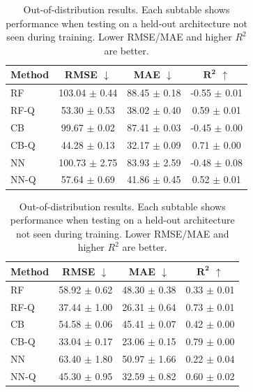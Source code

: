 \begin{table}[t]
    \centering
    \caption{Out-of-distribution results. Each subtable shows performance when testing on a held-out architecture not seen during training. Lower RMSE/MAE and higher $R^2$ are better.}
    \label{tab:ood-results}
    \vspace{0.5em}
    \begin{minipage}{0.48\textwidth}
        \centering
        \label{tab:ood-h100}
        \begin{tabular}{lccc}
            \toprule
            \textbf{Method} & \textbf{RMSE} $\downarrow$ & \textbf{MAE} $\downarrow$ & $\boldsymbol{R^2}$ $\uparrow$ \\
            \midrule
            RF      & 103.04 $\pm$ 0.44 & 88.45 $\pm$ 0.18 & -0.55 $\pm$ 0.01 \\
            RF-Q    & 53.30 $\pm$ 0.53 & 38.02 $\pm$ 0.40 & 0.59 $\pm$ 0.01 \\
            \midrule
            CB      & 99.67 $\pm$ 0.02 & 87.41 $\pm$ 0.03 & -0.45 $\pm$ 0.00 \\
            CB-Q    & 44.28 $\pm$ 0.13 & 32.17 $\pm$ 0.09 & 0.71 $\pm$ 0.00 \\
            \midrule
            NN      & 100.73 $\pm$ 2.75 & 83.93 $\pm$ 2.59 & -0.48 $\pm$ 0.08 \\
            NN-Q    & 57.64 $\pm$ 0.69 & 41.86 $\pm$ 0.45 & 0.52 $\pm$ 0.01 \\
            \bottomrule
        \end{tabular}
    \end{minipage}
    \hfill
    \begin{minipage}{0.48\textwidth}
        \centering
        \label{tab:ood-a100}
        \begin{tabular}{lccc}
            \toprule
            \textbf{Method} & \textbf{RMSE} $\downarrow$ & \textbf{MAE} $\downarrow$ & $\boldsymbol{R^2}$ $\uparrow$ \\
            \midrule
            RF      & 58.92 $\pm$ 0.62 & 48.30 $\pm$ 0.38 & 0.33 $\pm$ 0.01 \\
            RF-Q    & 37.44 $\pm$ 1.00 & 26.31 $\pm$ 0.64 & 0.73 $\pm$ 0.01 \\
            \midrule
            CB      & 54.58 $\pm$ 0.06 & 45.41 $\pm$ 0.07 & 0.42 $\pm$ 0.00 \\
            CB-Q    & 33.04 $\pm$ 0.17 & 23.06 $\pm$ 0.15 & 0.79 $\pm$ 0.00 \\
            \midrule
            NN      & 63.40 $\pm$ 1.80 & 50.97 $\pm$ 1.66 & 0.22 $\pm$ 0.04 \\
            NN-Q    & 45.30 $\pm$ 0.95 & 32.59 $\pm$ 0.82 & 0.60 $\pm$ 0.02 \\
            \bottomrule
        \end{tabular}
    \end{minipage}


\end{table}
